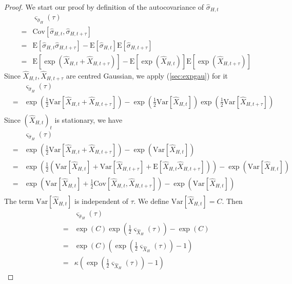 \documentclass[a4paper, twoside, 11pt]{article}
\theoremstyle{definition}
\begin{document}
\begin{proof}
  We start our proof by definition of the autocovariance of $\hat{\sigma}_{H,t}$
  \begin{eqnarray*}
	&& \varsigma_{\hat{\sigma}_H}(\tau) \\
	&=& \mathrm{Cov}[\hat{\sigma}_{H,t}, \hat{\sigma}_{H, t+\tau}]\\
	&=& \mathrm{E}[\hat{\sigma}_{H,t} \hat{\sigma}_{H, t+\tau}] - \mathrm{E}[\hat{\sigma}_{H,t}]\mathrm{E}[\hat{\sigma}_{H,t+\tau}]\\
	&=& \mathrm{E}[\exp(\hat{X}_{H,t} + \hat{X}_{H, t+\tau})] - \mathrm{E}[\exp(\hat{X}_{H,t})]\mathrm{E}[\exp(\hat{X}_{H,t+\tau})] 
  \end{eqnarray*}
  Since $\hat{X}_{H,t}, \hat{X}_{H,t+\tau}$ are centred Gaussian, we apply (\ref{sec:expgau}) for it
  \begin{eqnarray*}
	&& \varsigma_{\hat{\sigma}_H}(\tau) \\
	&=& \exp(\frac{1}{2}\mathrm{Var}[\hat{X}_{H,t} + \hat{X}_{H, t+\tau}]) - \exp(\frac{1}{2}\mathrm{Var}[\hat{X}_{H,t}])  \exp(\frac{1}{2}\mathrm{Var}[\hat{X}_{H,t+\tau}])\\
  \end{eqnarray*}
  Since $(\hat{X}_{H,t})_t$ is stationary, we have
  \begin{eqnarray*}
	&& \varsigma_{\hat{\sigma}_H}(\tau) \\
	&=&  \exp(\frac{1}{2}\mathrm{Var}[\hat{X}_{H,t} + \hat{X}_{H, t+\tau}]) - \exp(\mathrm{Var}[\hat{X}_{H,t}])\\
	&=& \exp(\frac{1}{2}(\mathrm{Var}[\hat{X}_{H,t}] + \mathrm{Var}[\hat{X}_{H,t+\tau}] + \mathrm{E}[\hat{X}_{H,t}\hat{X}_{H,t+\tau}])) - \exp(\mathrm{Var}[\hat{X}_{H,t}])\\
	&=& \exp(\mathrm{Var}[\hat{X}_{H,t}] + \frac{1}{2}\mathrm{Cov}[\hat{X}_{H,t}, \hat{X}_{H,t+\tau}]) - \exp(\mathrm{Var}[\hat{X}_{H,t}])\\
  \end{eqnarray*}
  The term $\mathrm{Var}[\hat{X}_{H,t}]$ is independent of $\tau$. We define $\mathrm{Var}[\hat{X}_{H,t}] = C$. Then
\begin{eqnarray*}
	&& \varsigma_{\hat{\sigma}_H}(\tau) \\
	&=& \exp(C) \exp(\frac{1}{2}\varsigma_{\hat{X}_{H}}(\tau)) - \exp(C)\\
	&=& \exp(C)(\exp(\frac{1}{2}\varsigma_{\hat{X}_{H}}(\tau)) - 1)\\
	&=& \kappa(\exp(\frac{1}{2}\varsigma_{\hat{X}_{H}}(\tau)) - 1)
 \end{eqnarray*}

\end{proof}
\end{document}
